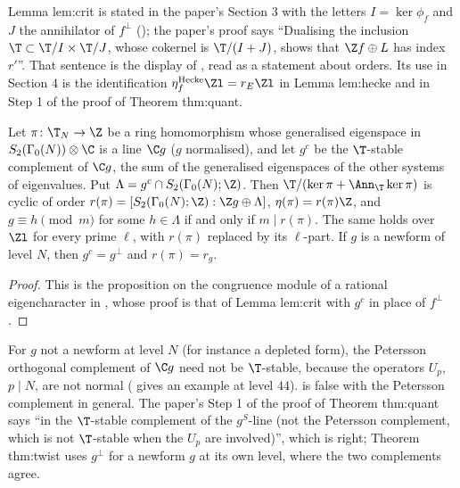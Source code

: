 \begin{paperlink}
Lemma lem:crit is stated in the paper's Section 3 with the letters $I=\ker\phi_f$ and $J$ the annihilator of $f^\perp$ (); the paper's proof says
``Dualising the inclusion $\T\subset\T/I\times\T/J$, whose cokernel is $\T/(I+J)$, shows that $\Z f\oplus L$ has index $r'$''. That sentence is the display of
, read as a statement about orders. Its use in Section 4 is the identification $\eta^{\mathrm{Hecke}}_f\Zl=r_E\Zl$ in Lemma lem:hecke and in Step 1 of the proof of Theorem thm:quant.
\end{paperlink}

\begin{proposition}\label{prop:congruence:crit-general}
Let $\pi\colon\T_N\to\Z$ be a ring homomorphism whose generalised eigenspace in $S_2(\Gamma_0(N))\otimes\C$ is a line $\C g$ ($g$ normalised), and let $g^c$ be the $\T$-stable complement of
$\C g$, the sum of the generalised eigenspaces of the other systems of eigenvalues. Put $\Lambda=g^c\cap S_2(\Gamma_0(N);\Z)$. Then $\T/(\ker\pi+\Ann_\T\ker\pi)$ is cyclic of order
$r(\pi)=[S_2(\Gamma_0(N);\Z):\Z g\oplus\Lambda]$, $\eta(\pi)=r(\pi)\Z$, and $g\equiv h\pmod m$ for some $h\in\Lambda$ if and only if $m\mid r(\pi)$. The same holds over $\Zl$ for every prime $\ell$, with
$r(\pi)$ replaced by its $\ell$-part. If $g$ is a newform of level $N$, then $g^c=g^\perp$ and $r(\pi)=r_g$.
\end{proposition}

\begin{proof}
This is the proposition on the congruence module of a rational eigencharacter in , whose proof is that of Lemma lem:crit with $g^c$ in place of $f^\perp$.
\end{proof}

\begin{warning}\label{warn:congruence:complement}
For $g$ not a newform at level $N$ (for instance a depleted form), the Petersson orthogonal complement of $\C g$ need not be $\T$-stable, because the operators $U_p$, $p\mid N$, are
not normal ( gives an example at level $44$).  is false with the Petersson complement in general. The paper's Step 1 of the
proof of Theorem thm:quant says ``in the $\T$-stable complement of the $g^S$-line (not the Petersson complement, which is not $\T$-stable when the $U_p$ are involved)'', which is
right; Theorem thm:twist uses $g^\perp$ for a newform $g$ at its own level, where the two complements agree.
\end{warning}

